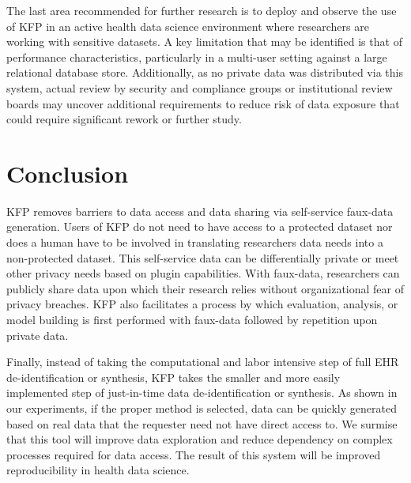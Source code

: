 \documentclass{amia}
\begin{document}
The last area recommended for further research is to deploy and observe the use of KFP in an active health data science environment where researchers are working with sensitive datasets. A key limitation that may be identified is that of performance characteristics, particularly in a multi-user setting against a large relational database store. Additionally, as no private data was distributed via this system, actual review by security and compliance groups or institutional review boards may uncover additional requirements to reduce risk of data exposure that could require significant rework or further study.

\section{Conclusion}

KFP removes barriers to data access and data sharing via self-service faux-data generation. Users of KFP do not need to have access to a protected dataset nor does a human have to be involved in translating researchers data needs into a non-protected dataset. This self-service data can be differentially private or meet other privacy needs based on plugin capabilities. With faux-data, researchers can publicly share data upon which their research relies without organizational fear of privacy breaches. KFP also facilitates a process by which evaluation, analysis, or model building is first performed with faux-data followed by repetition upon private data. 

Finally, instead of taking the computational and labor intensive step of full EHR de-identification or synthesis, KFP takes the smaller and more easily implemented step of just-in-time data de-identification or synthesis. As shown in our experiments, if the proper method is selected, data can be quickly generated based on real data that the requester need not have direct access to. We surmise that this tool will improve data exploration and reduce dependency on complex processes required for data access. The result of this system will be improved reproducibility in health data science.




\end{document}
